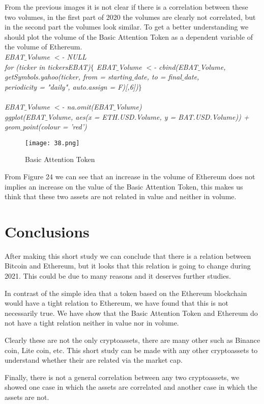 \documentclass[14pt]{amsart}
\begin{document}
From the previous images it is not clear if there is a correlation between these two volumes, in the first part of 2020 the volumes are clearly not correlated, but in the second part the volumes look similar. To get a better understanding we should plot the volume of the Basic Attention Token as a dependent variable of the volume of Ethereum.\\

\noindent \textit{EBAT$\_$Volume $<$- NULL}\\
\noindent \textit{for (ticker in tickersEBAT)$\{$  EBAT$\_$Volume $<$- cbind(EBAT$\_$Volume, }\\
\indent\textit{getSymbols.yahoo(ticker, from = starting$\_$date, to = final$\_$date, }\\
\indent\textit{periodicity = "daily", auto.assign = F)[,6])$\}$}\\ \\

\noindent \textit{EBAT$\_$Volume $<$- na.omit(EBAT$\_$Volume)}\\
\noindent \textit{ggplot(EBAT$\_$Volume, aes(x = ETH.USD.Volume, y = BAT.USD.Volume)) + geom$\_$point(colour = 'red')}\\

\begin{figure}[h!]
  \texttt{[image: 38.png]}
  \caption{Basic Attention Token}
  \label{fig:boat1}
\end{figure}

From Figure 24 we can see that an increase in the volume of Ethereum does not implies an increase on the value of the Basic Attention Token, this makes us think that these two assets are not related in value and neither in volume.

\section{Conclusions}
After making this short study we can conclude that there is a relation between Bitcoin and Ethereum, but it looks that this relation is going to change during 2021. This could be due to many reasons and it deserves further studies. 

In contrast of the simple idea that a token based on the Ethereum blockchain would have a tight relation to Ethereum, we have found that this is not necessarily true. We have show that the Basic Attention Token and Ethereum do not have a tight relation neither in value nor in volume. 

Clearly these are not the only cryptoassets, there are many other such as Binance coin, Lite coin, etc. This short study can be made with any other cryptoassets to understand whether their are related via the market cap.

Finally, there is not a general correlation between any two cryptoassets, we showed one case in which the assets are correlated and another case in which the assets are not.
\end{document}
